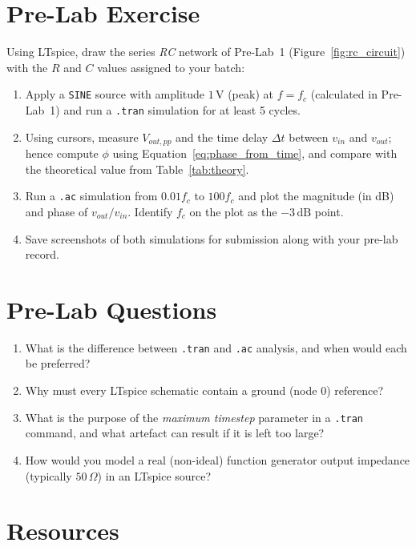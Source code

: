 \section*{Pre-Lab Exercise}

Using LTspice, draw the series \emph{RC} network of Pre-Lab~1 (Figure~\ref{fig:rc_circuit}) with the $R$ and $C$ values assigned to your batch:

\begin{enumerate}[label=(\alph*)]
	\item Apply a \texttt{SINE} source with amplitude $1\,\text{V}$ (peak) at $f = f_c$ (calculated in Pre-Lab~1) and run a \texttt{.tran} simulation for at least 5 cycles.
	\item Using cursors, measure $V_{out,pp}$ and the time delay $\Delta t$ between $v_{in}$ and $v_{out}$; hence compute $\phi$ using Equation~\eqref{eq:phase_from_time}, and compare with the theoretical value from Table~\ref{tab:theory}.
	\item Run a \texttt{.ac} simulation from $0.01f_c$ to $100f_c$ and plot the magnitude (in dB) and phase of $v_{out}/v_{in}$. Identify $f_c$ on the plot as the $-3\,\text{dB}$ point.
	\item Save screenshots of both simulations for submission along with your pre-lab record.
\end{enumerate}

\section*{Pre-Lab Questions}
\begin{enumerate}[label=Q\arabic*.]
	\item What is the difference between \texttt{.tran} and \texttt{.ac} analysis, and when would each be preferred?
	\item Why must every LTspice schematic contain a ground (node 0) reference?
	\item What is the purpose of the \emph{maximum timestep} parameter in a \texttt{.tran} command, and what artefact can result if it is left too large?
	\item How would you model a real (non-ideal) function generator output impedance (typically $50\,\Omega$) in an LTspice source?
\end{enumerate}

\section*{Resources}

